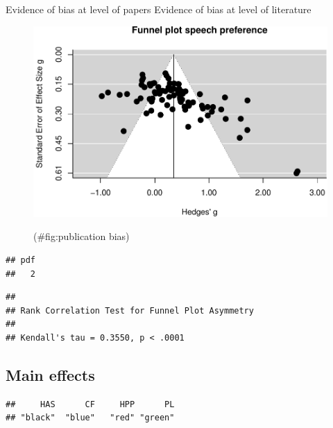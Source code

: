 \documentclass[man]{apa6}
\begin{document}
Evidence of bias at level of papers Evidence of bias at level of
literature

\begin{figure}

{\centering \includegraphics{MA_speech_pref_files/figure-latex/publication bias-1} 

}

\caption{ }(\#fig:publication bias)
\end{figure}

\begin{verbatim}
## pdf 
##   2
\end{verbatim}

\begin{verbatim}
## 
## Rank Correlation Test for Funnel Plot Asymmetry
## 
## Kendall's tau = 0.3550, p < .0001
\end{verbatim}

\subsection{Main effects}\label{main-effects}

\begin{verbatim}
##     HAS      CF     HPP      PL 
## "black"  "blue"   "red" "green"
\end{verbatim}
\end{document}
